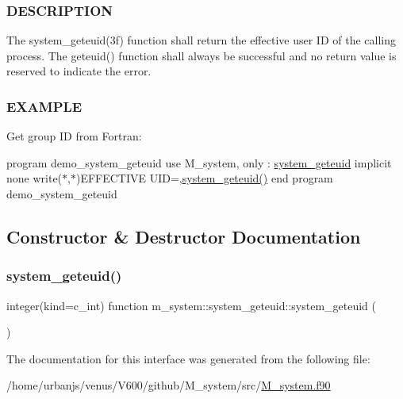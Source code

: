 \subsubsection*{D\+E\+S\+C\+R\+I\+P\+T\+I\+ON}

The system\+\_\+geteuid(3f) function shall return the effective user ID of the calling process. The geteuid() function shall always be successful and no return value is reserved to indicate the error. \subsubsection*{E\+X\+A\+M\+P\+LE}

Get group ID from Fortran\+:

program demo\+\_\+system\+\_\+geteuid use M\+\_\+system, only \+: \mbox{\hyperlink{interfacem__system_1_1system__geteuid}{system\+\_\+geteuid}} implicit none write($\ast$,$\ast$)\textquotesingle{}E\+F\+F\+E\+C\+T\+I\+VE U\+ID=\textquotesingle{},\mbox{\hyperlink{interfacem__system_1_1system__geteuid_af9661841f8178c662ba33a85a938183e}{system\+\_\+geteuid()}} end program demo\+\_\+system\+\_\+geteuid 

\subsection{Constructor \& Destructor Documentation}
\mbox{\label{interfacem__system_1_1system__geteuid_af9661841f8178c662ba33a85a938183e}} 
\subsubsection{\texorpdfstring{system\+\_\+geteuid()}{system\_geteuid()}}
{\footnotesize\ttfamily integer(kind=c\+\_\+int) function m\+\_\+system\+::system\+\_\+geteuid\+::system\+\_\+geteuid (\begin{DoxyParamCaption}{ }\end{DoxyParamCaption})\hspace{0.3cm}{\ttfamily [private]}}



The documentation for this interface was generated from the following file\+:\begin{DoxyCompactItemize}
\item 
/home/urbanjs/venus/\+V600/github/\+M\+\_\+system/src/\mbox{\hyperlink{M__system_8f90}{M\+\_\+system.\+f90}}\end{DoxyCompactItemize}
